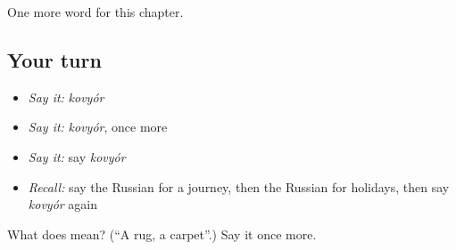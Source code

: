 \begin{grammarlens}[title={What you've built}]
One more word for this chapter.
\end{grammarlens}

\subsection*{Your turn}
\begin{itemize}
\raggedright
  \item \emph{Say it:} \emph{kovyór}
  \item \emph{Say it:} \emph{kovyór}, once more
  \item \emph{Say it:} say \emph{kovyór}
  \item \emph{Recall:} say the Russian for a journey, then the Russian for holidays, then say \emph{kovyór} again
\end{itemize}

\begin{tcolorbox}[breakable,colback=teal!4,colframe=teal!35!black,title={Before you move on}]
What does  mean? (\textquotedblleft{}A rug, a carpet\textquotedblright{}.) Say it once more.
\end{tcolorbox}

